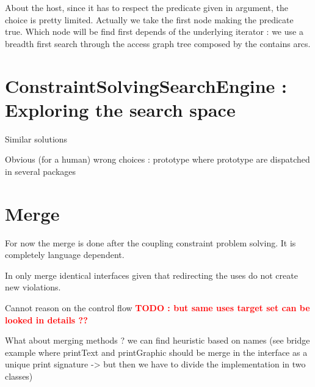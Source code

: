 \documentclass[]{article}
\newcommand{\todo}[1]{\textcolor{red}{\textbf{TODO : #1}}}
\begin{document}
About the host, since it has to respect the predicate given in argument, the choice is pretty limited. Actually we take the first node making the predicate true. Which node will be find first depends of the underlying iterator : we use a breadth first search through the access graph tree composed by the contains arcs.

\section{ConstraintSolvingSearchEngine : Exploring the search space}

Similar solutions

Obvious (for a human) wrong choices : prototype where prototype are dispatched in several packages 

\section{Merge}
For now the merge is done after the coupling constraint problem solving. It is completely language dependent.

In only merge identical interfaces given that redirecting the uses do not create new violations.

Cannot reason on the control flow \todo{but same uses target set can be looked in details ??}

What about merging methods ?  we can find heuristic based on names (see bridge example where printText and printGraphic should be merge in the interface as a unique print signature -> but then we have to divide the implementation in two classes)




\end{document}

